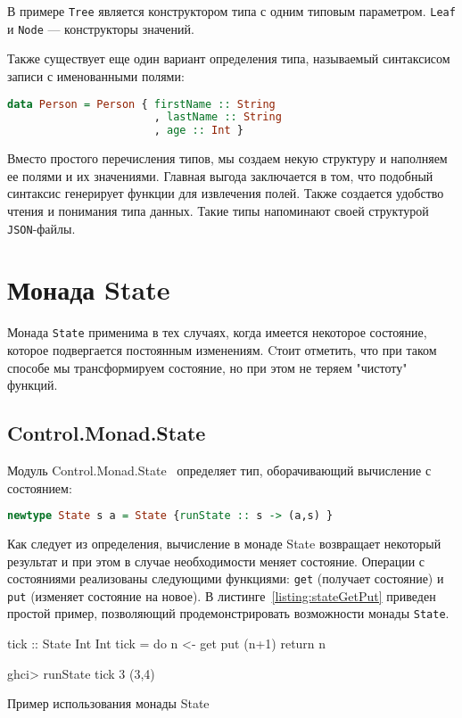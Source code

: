 В примере \lstinline{Tree} является конструктором типа с одним типовым параметром. \lstinline{Leaf} и \lstinline{Node} --- конструкторы значений. 

Также существует еще один вариант определения типа, называемый синтаксисом записи с именованными полями:

\begin{lstlisting}[language=Haskell]
data Person = Person { firstName :: String
                       , lastName :: String
                       , age :: Int }
\end{lstlisting}

Вместо простого перечисления типов, мы создаем некую структуру и наполняем ее полями и их значениями. Главная выгода заключается в том, что подобный синтаксис генерирует функции для извлечения полей. Также создается удобство чтения и понимания типа данных. Такие типы напоминают своей структурой \lstinline{JSON}-файлы. 

\section{Монада State}

Монада \lstinline{State} применима в тех случаях, когда имеется некоторое состояние, которое подвергается постоянным изменениям. Cтоит отметить, что при таком способе мы трансформируем состояние, но при этом не теряем "чистоту" \: функций. 

\subsection{Control.Monad.State}

Модуль Control.Monad.State~\cite{stateControl} определяет тип, оборачивающий вычисление с состоянием:

\begin{lstlisting}[language=Haskell]
newtype State s a = State {runState :: s -> (a,s) }
\end{lstlisting} 

Как следует из определения, вычисление в монаде State возвращает некоторый результат и при этом в случае необходимости меняет состояние. Операции с состояниями реализованы следующими функциями: \lstinline{get} (получает состояние) и \lstinline{put} (изменяет состояние на новое). В листинге~\ref{listing:stateGetPut} приведен простой пример, позволяющий продемонстрировать возможности монады \lstinline{State}.

\begin{ListingEnv}[H]
\begin{Verb}
tick :: State Int Int
tick = do n <- get
	  put (n+1)
          return n

ghci> runState tick 3
(3,4)
\end{Verb}
\caption{Пример использования монады State}
\label{listing:stateGetPut}
\end{ListingEnv}

